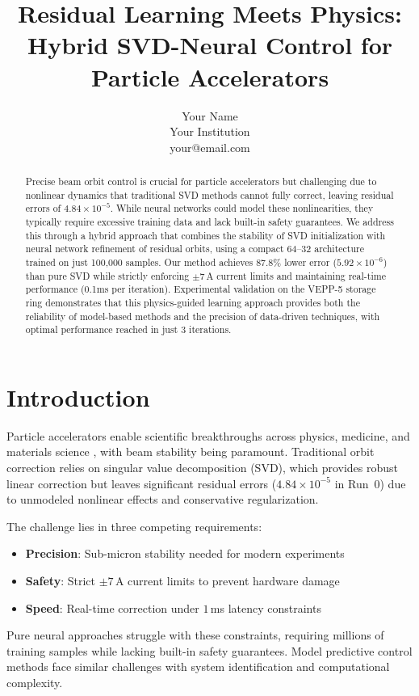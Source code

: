 \documentclass{article} %
\title{Residual Learning Meets Physics: Hybrid SVD-Neural Control for Particle Accelerators}
\author{Your Name\\
Your Institution\\
your@email.com
}
\begin{document}
\maketitle

\begin{abstract}
Precise beam orbit control is crucial for particle accelerators but challenging due to nonlinear dynamics that traditional SVD methods cannot fully correct, leaving residual errors of $4.84 \times 10^{-5}$. While neural networks could model these nonlinearities, they typically require excessive training data and lack built-in safety guarantees. We address this through a hybrid approach that combines the stability of SVD initialization with neural network refinement of residual orbits, using a compact 64--32 architecture trained on just 100,000 samples. Our method achieves 87.8\% lower error ($5.92 \times 10^{-6}$) than pure SVD while strictly enforcing $\pm7$\,A current limits and maintaining real-time performance (0.1ms per iteration). Experimental validation on the VEPP-5 storage ring demonstrates that this physics-guided learning approach provides both the reliability of model-based methods and the precision of data-driven techniques, with optimal performance reached in just 3 iterations.
\end{abstract}

\section{Introduction}
\label{sec:intro}
Particle accelerators enable scientific breakthroughs across physics, medicine, and materials science \citep{lu2024aiscientist}, with beam stability being paramount. Traditional orbit correction relies on singular value decomposition (SVD), which provides robust linear correction but leaves significant residual errors ($4.84 \times 10^{-5}$ in Run~0) due to unmodeled nonlinear effects and conservative regularization.

The challenge lies in three competing requirements:
\begin{itemize}
\item \textbf{Precision}: Sub-micron stability needed for modern experiments
\item \textbf{Safety}: Strict $\pm7$\,A current limits to prevent hardware damage
\item \textbf{Speed}: Real-time correction under $1$\,ms latency constraints
\end{itemize}

Pure neural approaches \citep{goodfellow2016deep} struggle with these constraints, requiring millions of training samples while lacking built-in safety guarantees. Model predictive control methods face similar challenges with system identification and computational complexity.
\end{document}
